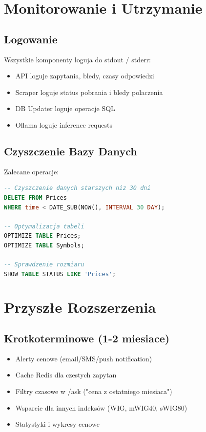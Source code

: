 \documentclass[11pt,a4paper]{article}
\begin{document}
\section{Monitorowanie i Utrzymanie}

\subsection{Logowanie}

Wszystkie komponenty loguja do stdout / stderr:

\begin{itemize}
    \item API loguje zapytania, bledy, czasy odpowiedzi
    \item Scraper loguje status pobrania i bledy polaczenia
    \item DB Updater loguje operacje SQL
    \item Ollama loguje inference requests
\end{itemize}

\subsection{Czyszczenie Bazy Danych}

Zalecane operacje:

\begin{lstlisting}[language=sql]
-- Czyszczenie danych starszych niz 30 dni
DELETE FROM Prices 
WHERE time < DATE_SUB(NOW(), INTERVAL 30 DAY);

-- Optymalizacja tabeli
OPTIMIZE TABLE Prices;
OPTIMIZE TABLE Symbols;

-- Sprawdzenie rozmiaru
SHOW TABLE STATUS LIKE 'Prices';
\end{lstlisting}

\section{Przyszłe Rozszerzenia}

\subsection{Krotkoterminowe (1-2 miesiace)}

\begin{itemize}
    \item Alerty cenowe (email/SMS/push notification)
    \item Cache Redis dla czestych zapytan
    \item Filtry czasowe w /ask ("cena z ostatniego miesiaca")
    \item Wsparcie dla innych indeksów (WIG, mWIG40, sWIG80)
    \item Statystyki i wykresy cenowe
\end{itemize}
\end{document}
